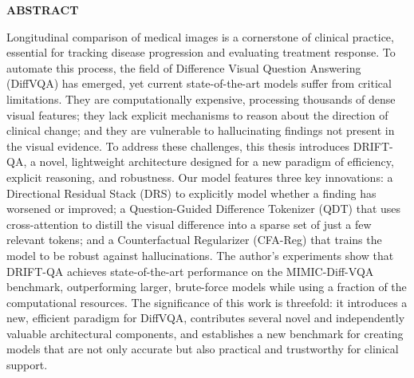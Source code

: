 {}

\begin{center}
    \large{\bf ABSTRACT}
\end{center}

Longitudinal comparison of medical images is a cornerstone of clinical practice, essential for tracking disease progression and evaluating treatment response. To automate this process, the field of Difference Visual Question Answering (DiffVQA) has emerged, yet current state-of-the-art models suffer from critical limitations. They are computationally expensive, processing thousands of dense visual features; they lack explicit mechanisms to reason about the direction of clinical change; and they are vulnerable to hallucinating findings not present in the visual evidence. To address these challenges, this thesis introduces DRIFT-QA, a novel, lightweight architecture designed for a new paradigm of efficiency, explicit reasoning, and robustness. Our model features three key innovations: a Directional Residual Stack (DRS) to explicitly model whether a finding has worsened or improved; a Question-Guided Difference Tokenizer (QDT) that uses cross-attention to distill the visual difference into a sparse set of just a few relevant tokens; and a Counterfactual Regularizer (CFA-Reg) that trains the model to be robust against hallucinations. The author's experiments show that DRIFT-QA achieves state-of-the-art performance on the MIMIC-Diff-VQA benchmark, outperforming larger, brute-force models while using a fraction of the computational resources. The significance of this work is threefold: it introduces a new, efficient paradigm for DiffVQA, contributes several novel and independently valuable architectural components, and establishes a new benchmark for creating models that are not only accurate but also practical and trustworthy for clinical support.
